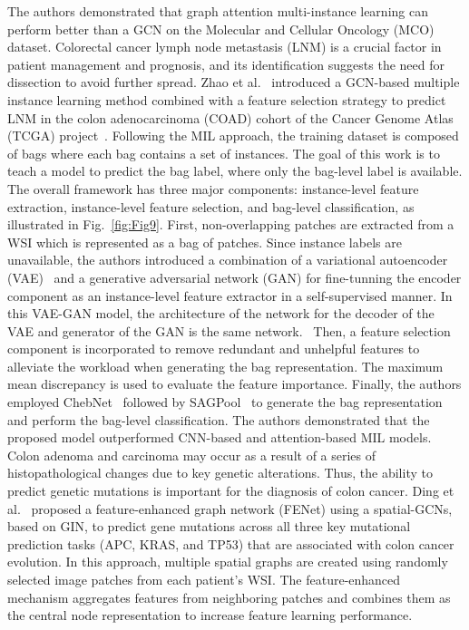 The authors demonstrated that graph attention multi-instance learning can perform better than a GCN on the Molecular and Cellular Oncology (MCO)~ dataset.
Colorectal cancer lymph node metastasis (LNM) is a crucial factor in patient management and prognosis, and its identification suggests the need for dissection to avoid further spread.
Zhao et al.~ introduced a GCN-based multiple instance learning method combined with a feature selection strategy to predict LNM in the colon adenocarcinoma (COAD) cohort of the Cancer Genome Atlas (TCGA) project~.
Following the MIL approach, the training dataset is composed of bags where each bag contains a set of instances. The goal of this work is to teach a model to predict the bag label, where only the bag-level label is available.
The overall framework has three major components: instance-level feature extraction, instance-level feature selection, and bag-level classification, as illustrated in Fig.~\ref{fig:Fig9}. 
First, non-overlapping patches are extracted from a WSI which is represented as a bag of patches. Since instance labels are unavailable, the authors introduced a combination of a variational autoencoder (VAE)~ and a generative adversarial network (GAN) for fine-tunning the encoder component as an instance-level feature extractor in a self-supervised manner. In this VAE-GAN model, the architecture of the network for the decoder of the VAE and generator of the GAN is the same network. \
Then, a feature selection component is incorporated to remove redundant and unhelpful features to alleviate the workload when generating the bag representation. The maximum mean discrepancy is used to evaluate the feature importance. Finally, the authors employed ChebNet~ followed by SAGPool~ to generate the bag representation and perform the bag-level classification.
The authors demonstrated that the proposed model outperformed CNN-based and attention-based MIL models.
Colon adenoma and carcinoma may occur as a result of a series of histopathological changes due to key genetic alterations. Thus, the ability to predict genetic mutations is important for the diagnosis of colon cancer.
Ding et al.~ proposed a feature-enhanced graph network (FENet) using a spatial-GCNs, based on GIN, to predict gene mutations across all three key mutational prediction tasks (APC, KRAS, and TP53) that are associated with colon cancer evolution. In this approach, multiple spatial graphs are created using randomly selected image patches from each patient's WSI. 
The feature-enhanced mechanism aggregates features from neighboring patches and combines them as the central node representation to increase feature learning performance. 
